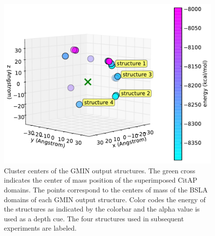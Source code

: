 \documentclass[english, a4paper, 12pt, titlepage, draft]{article}
\begin{document}
\begin{figure}
    \centering
    \includegraphics[width=1.0\textwidth]{figures/GMIN/CitA_phi_theta_3D.pdf}
    \caption{Cluster centers of the GMIN output structures. The green cross indicates the center of mass position of the superimposed CitAP domains. The points correspond to the centers of mass of the BSLA domains of each GMIN output structure. Color codes the energy of the structures as indicated by the colorbar and the alpha value is used as a depth cue. The four structures used in subsequent experiments are labeled.}
    \label{fig:GMIN_results}
\end{figure}       

 
\end{document}
